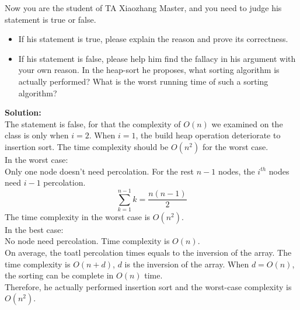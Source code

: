 \documentclass[10.5pt]{article}
\begin{document}
Now you are the student of TA Xiaozhang Master, and you need to judge his statement is true or false. 
\begin{itemize}
	\item{If his statement is true, please explain the reason and prove its correctness.}
	\item{If his statement is false, please help him find the fallacy in his argument with your own reason. In the heap-sort he proposes, what sorting algorithm is actually performed? What is the worst running time of such a sorting algorithm?}
\end{itemize}
\textbf{Solution:}\\
The statement is false, for that the complexity of $O(n)$ we examined on the class is only when $i = 2$. When $i = 1$, the build heap operation deteriorate to insertion sort. The time complexity should be $O(n^2)$ for the worst case.\\

In the worst case:\\
Only one node doesn't need percolation.
For the rest $n - 1$ nodes, the $i^{th}$ nodes need $i - 1$ percolation.\\
$$
\sum_{k = 1}^{n - 1} k = \frac{n(n - 1)}{2}
$$
The time complexity in the worst case is $O(n^2)$.\\
In the best case:\\
No node need percolation. Time complexity is $O(n)$.\\
On average, the toatl percolation times equals to the inversion of the array. The time complexity is $O(n + d)$, $d$ is the inversion of the array. When $d = O(n)$, the sorting can be complete in $O(n)$ time.\\
Therefore, he actually performed insertion sort and the worst-case complexity is $O(n^2)$.



























\end{document}
